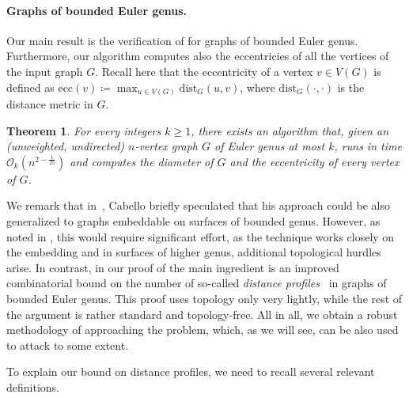 \documentclass[11pt,a4paper]{article}
\newtheorem{theorem}[lemma]{Theorem}
\newcommand{\Oh}{\mathcal{O}}
\newcommand{\dist}{\mathrm{dist}}
\newcommand{\ecc}{\mathrm{ecc}}
\renewcommand{\geq}{\geqslant}
\begin{document}
\paragraph{Graphs of bounded Euler genus.}
Our main result is the verification of  for graphs
of bounded Euler genus. Furthermore, our algorithm computes also the eccentricies
of all the vertices of the input graph $G$. Recall here that
    the eccentricity of a vertex $v \in V(G)$ is defined as
    $\ecc(v) \coloneqq \max_{u \in V(G)} \dist_G(u,v)$, where $\dist_G(\cdot,\cdot)$ is the distance metric in $G$.
\begin{theorem}\label{thm:main-genus}
For every integers $k \geq 1$,
there exists an algorithm that, given an (unweighted, undirected) $n$-vertex graph $G$
of Euler genus at most $k$, runs in time $\Oh_k(n^{2-\frac{1}{25}})$
and computes the diameter of $G$ and the eccentricity of every vertex of $G$.
\end{theorem}

We remark that in~\cite[Section~9]{Cabello19}, Cabello briefly speculated that his approach could be also generalized to graphs embeddable on surfaces of bounded genus. However, as noted in \cite{Cabello19}, this would require significant effort, as the technique works closely on the embedding and in surfaces of higher genus, additional topological hurdles arise. In contrast, in our proof of  the main ingredient is an improved combinatorial bound on the number of so-called \emph{distance profiles}~\cite{LeW24} in graphs of bounded Euler genus. This proof uses topology only very lightly, while the rest of the argument is rather standard and topology-free. All in all, we obtain a robust methodology of approaching the problem, which, as we will see, can be also used to attack  to some extent.

To explain our bound on distance profiles, we need to recall several relevant definitions.
\end{document}
